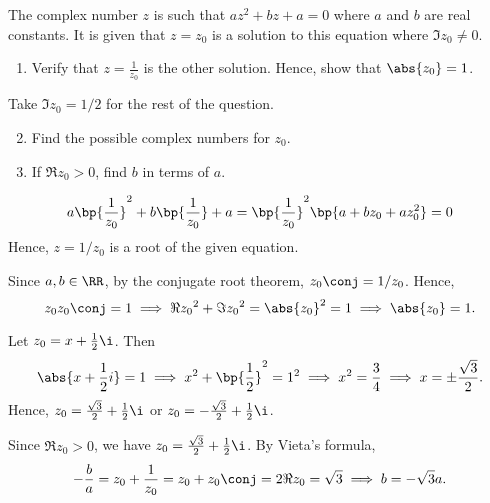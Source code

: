 \begin{problem}
    The complex number $z$ is such that $az^2 + bz + a = 0$ where $a$ and $b$ are real constants. It is given that $z = z_0$ is a solution to this equation where $\Im{z_0} \neq 0$.

    \begin{enumerate}
        \item Verify that $z = \frac1{z_0}$ is the other solution. Hence, show that $\abs{z_0} = 1$.
    \end{enumerate}

    Take $\Im{z_0} = 1/2$ for the rest of the question.

    \begin{enumerate}
        \setcounter{enumi}{1}
        \item Find the possible complex numbers for $z_0$.
        \item If $\Re{z_0} > 0$, find $b$ in terms of $a$.
    \end{enumerate}
\end{problem}
\begin{solution}
    \begin{ppart}
        \begin{equation*}
            a \bp{\frac1{z_0}}^2 + b\bp{\frac1{z_0}} + a = \bp{\frac1{z_0}}^2 \bp{a + bz_0 + az_0^2} = 0
        \end{equation*}
        Hence, $z = 1/z_0$ is a root of the given equation.

        Since $a, b \in \RR$, by the conjugate root theorem, $z_0\conj = 1/z_0$. Hence, \[z_0 z_0\conj = 1 \implies \Re{z_0}^2 + \Im{z_0}^2 = \abs{z_0}^2 = 1 \implies \abs{z_0} = 1.\]
    \end{ppart}
    \begin{ppart}
        Let $z_0 = x + \frac12\i$. Then \[\abs{x + \frac12 i} = 1 \implies x^2 + \bp{\frac12}^2 = 1^2 \implies x^2 = \frac34 \implies x = \pm\frac{\sqrt3}2.\] Hence, $z_0 = \frac{\sqrt3}2 + \frac12\i$ or $z_0 = -\frac{\sqrt3}2 + \frac12\i$.
    \end{ppart}
    \begin{ppart}
        Since $\Re{z_0} > 0$, we have $z_0 = \frac{\sqrt3}2 + \frac12\i$. By Vieta's formula, \[-\frac{b}{a} = z_0 + \frac1{z_0} = z_0 + z_0\conj = 2 \Re{z_0} = \sqrt3 \implies b = -\sqrt3 a.\]
    \end{ppart}
\end{solution}